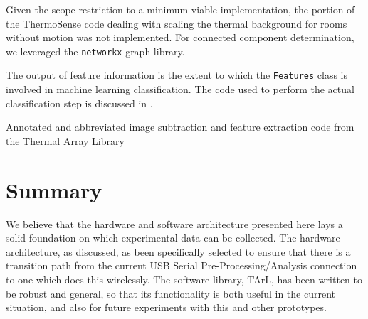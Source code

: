 \documentclass[../thesis/thesis.tex]{subfiles}
\begin{document}
Given the scope restriction to a minimum viable implementation, the portion of the ThermoSense code dealing with scaling the thermal background for rooms without motion was not implemented. For connected component determination, we leveraged the \texttt{networkx} graph library.

The output of feature information is the extent to which the \texttt{Features} class is involved in machine learning classification. The code used to perform the actual classification step is discussed in .

\begin{listing}
\centering

\caption{Annotated and abbreviated image subtraction and feature extraction code from the Thermal Array Library}
\label{lst:exps:featcode}
\end{listing}

\section{Summary}
We believe that the hardware and software architecture presented here lays a solid foundation on which experimental data can be collected. The hardware architecture, as discussed, as been specifically selected to ensure that there is a transition path from the current USB Serial Pre-Processing/Analysis connection to one which does this wirelessly. The software library, TArL, has been written to be robust and general, so that its functionality is both useful in the current situation, and also for future experiments with this and other prototypes.
 
\end{document}
